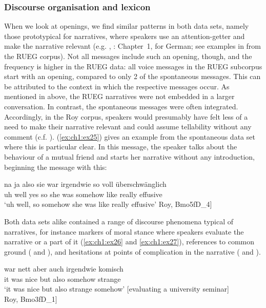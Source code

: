 \documentclass[output=paper,colorlinks,citecolor=brown]{langscibook}
\begin{document}
\subsubsection{Discourse organisation and lexicon} \label{ch1:sec:3.2.3}

When we look at openings, we find similar patterns in both data sets, namely those prototypical for narratives, where speakers use an attention-getter and make the narrative relevant (e.g. \citealt{quasthoff1979}, \citealt{ochscapps2002}: Chapter~1, \citealt{gulich2020} for German; see examples in  from the RUEG corpus). Not all messages include such an opening, though, and the frequency is higher in the RUEG data: all voice messages in the RUEG subcorpus start with an opening, compared to only 2 of the spontaneous messages. This can be attributed to the context in which the respective messages occur. As mentioned in  above, the RUEG narratives were not embedded in a larger conversation. In contrast, the spontaneous messages were often integrated. Accordingly, in the Roy corpus, speakers would presumably have felt less of a need to make their narrative relevant and could assume tellability without any comment (c.f. \citealt{konig2019}). (\ref{ex:ch1:ex25}) gives an example from the spontaneous data set where this is particular clear. In this message, the speaker talks about the behaviour of a mutual friend and starts her narrative without any introduction, beginning the message with this:

\ea\label{ex:ch1:ex25}

 {na} {ja} {also} {sie} {war} {irgendwie} {so} {voll} {überschwänglich} \\
uh well yes so she was somehow like really effusive \\
\trans ‘uh well, so somehow she was like really effusive’ \hspace{\fill}{[}Roy, Bmo5fD\_4{]}

\z
 
Both data sets alike contained a range of discourse phenomena typical of narratives, for instance markers of moral stance where speakers evaluate the narrative or a part of it (\ref{ex:ch1:ex26} and \ref{ex:ch1:ex27}), references to common ground ( and ), and hesitations at points of complication in the narrative ( and ).

\ea\label{ex:ch1:ex26}

 {war} {nett} {aber} {auch} {irgendwie} {komisch}  \\
it was nice but also somehow strange \\
\trans ‘it was nice but also strange somehow’ [evaluating a university seminar] \\ \hspace{\fill}{[}Roy, Bmo3fD\_1{]}
\z
\end{document}
